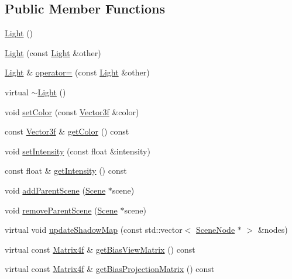 \subsection*{Public Member Functions}
\begin{DoxyCompactItemize}
\item 
\hyperlink{classburn_1_1_light_ae0ca792dd745afb8976640cfca5644d6}{Light} ()
\item 
\hyperlink{classburn_1_1_light_adaa47f7f4395a7ef12f78669a5694382}{Light} (const \hyperlink{classburn_1_1_light}{Light} \&other)
\item 
\hyperlink{classburn_1_1_light}{Light} \& \hyperlink{classburn_1_1_light_af49541104082b6f6c0f93cc4ff4161b5}{operator=} (const \hyperlink{classburn_1_1_light}{Light} \&other)
\item 
virtual \hyperlink{classburn_1_1_light_af0622c23bba106043efff05e027d1e04}{$\sim$\-Light} ()
\item 
void \hyperlink{classburn_1_1_light_a6178f2826887a4aba596523b3e001604}{set\-Color} (const \hyperlink{namespaceburn_afdd7cfb352b9612432faf6947b6fff74}{Vector3f} \&color)
\item 
const \hyperlink{namespaceburn_afdd7cfb352b9612432faf6947b6fff74}{Vector3f} \& \hyperlink{classburn_1_1_light_a0b43e6f4a60eed5ed3ff2f7a01d350eb}{get\-Color} () const 
\item 
void \hyperlink{classburn_1_1_light_a798ae7d682b85dcede11a89047f19508}{set\-Intensity} (const float \&intensity)
\item 
const float \& \hyperlink{classburn_1_1_light_ac5083292da85b9514dfa52ec933a563c}{get\-Intensity} () const 
\item 
void \hyperlink{classburn_1_1_light_ad1c8b2a8ff0af362741b01fa5873c683}{add\-Parent\-Scene} (\hyperlink{classburn_1_1_scene}{Scene} $\ast$scene)
\item 
void \hyperlink{classburn_1_1_light_a320f27149a8e49a1d2b563e423e9636c}{remove\-Parent\-Scene} (\hyperlink{classburn_1_1_scene}{Scene} $\ast$scene)
\item 
virtual void \hyperlink{classburn_1_1_light_af14d6771a1b6ff04195467f5c1c6a312}{update\-Shadow\-Map} (const std\-::vector$<$ \hyperlink{classburn_1_1_scene_node}{Scene\-Node} $\ast$ $>$ \&nodes)
\item 
virtual const \hyperlink{namespaceburn_a643e9d2ffceb4304e3755a100268a7a3}{Matrix4f} \& \hyperlink{classburn_1_1_light_af08ea0337d85542b856662d3fc78453b}{get\-Bias\-View\-Matrix} () const 
\item 
virtual const \hyperlink{namespaceburn_a643e9d2ffceb4304e3755a100268a7a3}{Matrix4f} \& \hyperlink{classburn_1_1_light_a2e9ec371a39bb44d98892b4076cc4766}{get\-Bias\-Projection\-Matrix} () const 

\end{DoxyCompactItemize}
